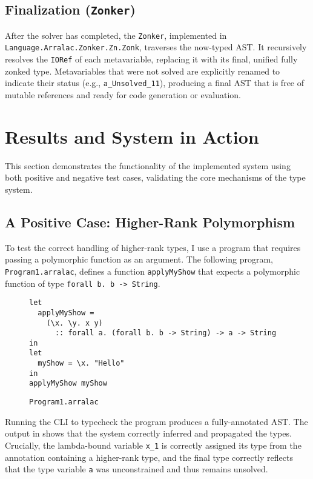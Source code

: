 \subsection{Finalization (\texttt{Zonker})}
After the solver has completed, the \texttt{Zonker}, implemented in \\ \texttt{Language.Arralac.Zonker.Zn.Zonk}, traverses the now-typed AST. It recursively resolves the \texttt{IORef} of each metavariable, replacing it with its final, unified fully zonked type. Metavariables that were not solved are explicitly renamed to indicate their status (e.g., \texttt{a\_Unsolved\_11}), producing a final AST that is free of mutable references and ready for code generation or evaluation.

\section{Results and System in Action}
\label{sec:Implementation:Results}

This section demonstrates the functionality of the implemented system using both positive and negative test cases, validating the core mechanisms of the type system.

\subsection{A Positive Case: Higher-Rank Polymorphism}
To test the correct handling of higher-rank types, I use a program that requires passing a polymorphic function as an argument. The following program, \texttt{Program1.arralac}, defines a function \texttt{applyMyShow} that expects a polymorphic function of type \texttt{forall b. b -> String}.

\begin{figure}
    \centering
    \begin{verbatim}
let
  applyMyShow =
    (\x. \y. x y)
      :: forall a. (forall b. b -> String) -> a -> String
in
let
  myShow = \x. "Hello"
in
applyMyShow myShow
\end{verbatim}
    \caption{\texttt{Program1.arralac}}
\end{figure}

Running the \Arralac CLI to typecheck the program produces a fully-annotated AST. The output in  shows that the system correctly inferred and propagated the types. Crucially, the lambda-bound variable \texttt{x\_1} is correctly assigned its type from the annotation containing a higher-rank type, and the final type correctly reflects that the type variable \texttt{a} was unconstrained and thus remains unsolved.


